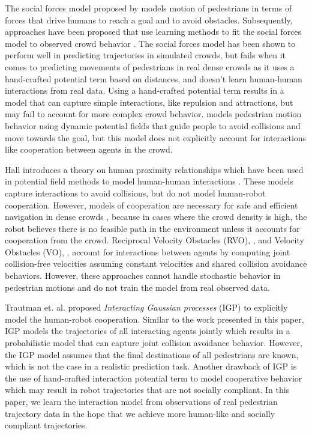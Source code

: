 The social forces model proposed by \cite{helbing95} models motion of pedestrians in terms of forces that drive humans to reach a goal and to avoid obstacles. Subsequently, approaches have been proposed that use learning methods to fit the social forces model to observed crowd behavior \cite{helbing09, johansson07}. The social forces model has been shown to perform well in predicting trajectories in simulated crowds, but fails when it comes to predicting movements of pedestrians in real dense crowds as it uses a hand-crafted potential term based on distances, and doesn't learn human-human interactions from real data. Using a hand-crafted potential term results in a model that can capture simple interactions, like repulsion and attractions, but may fail to account for more complex crowd behavior. \cite{adrien06} models pedestrian motion behavior using dynamic potential fields that guide people to avoid collisions and move towards the goal, but this model does not explicitly account for interactions like cooperation between agents in the crowd.

Hall \cite{hall63} introduces a theory on human proximity relationships which have been used in potential field methods to model human-human interactions \cite{svenstrup10, pradhan11}.
These models capture interactions to avoid collisions, but do not model human-robot cooperation. However,  models of cooperation are necessary for safe and efficient navigation in dense crowds \cite{trautman10}, because in cases where the crowd density is high, the robot believes there is no 
%
feasible
path in the environment unless it accounts for cooperation from the crowd. Reciprocal Velocity Obstacles (RVO), \cite{vandenberg08}, and Velocity Obstacles (VO), \cite{fiorini98}, account for interactions between agents by computing joint collision-free velocities assuming constant velocities and shared collision avoidance behaviors. However, these approaches cannot handle stochastic behavior in pedestrian motions and do not train the model from real observed data. 

Trautman et. al. \cite{trautman10} proposed \textit{Interacting Gaussian processes} (IGP) to explicitly model the human-robot cooperation. Similar to the work presented in this paper, IGP models the trajectories of all interacting agents jointly which results in a probabilistic model that can capture joint collision avoidance behavior. However, the IGP model assumes that the final destinations of all pedestrians are known, which is not the case in a realistic prediction task. 
%
Another drawback of IGP is the use of hand-crafted interaction potential term to model cooperative behavior which may result in robot trajectories that are not socially compliant. In this paper, we learn the interaction model from observations of real pedestrian trajectory data in the hope that we achieve more human-like and socially compliant trajectories. 


